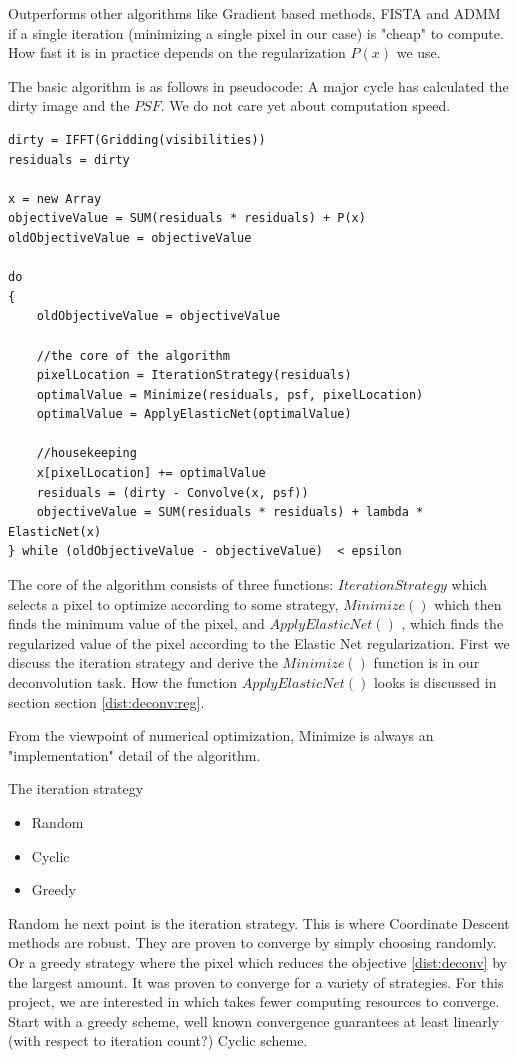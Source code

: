 Outperforms other algorithms like Gradient based methods, FISTA and ADMM if a single iteration (minimizing a single pixel in our case) is "cheap" to compute. 
How fast it is in practice depends on the regularization $P(x)$ we use.

The basic algorithm is as follows in pseudocode: A major cycle has calculated the dirty image and the $PSF$. We do not care yet about computation speed.

\begin{lstlisting}
dirty = IFFT(Gridding(visibilities))
residuals = dirty

x = new Array
objectiveValue = SUM(residuals * residuals) + P(x)
oldObjectiveValue = objectiveValue

do 
{
	oldObjectiveValue = objectiveValue

	//the core of the algorithm
	pixelLocation = IterationStrategy(residuals)
	optimalValue = Minimize(residuals, psf, pixelLocation)
	optimalValue = ApplyElasticNet(optimalValue)
	
	//housekeeping
	x[pixelLocation] += optimalValue
	residuals = (dirty - Convolve(x, psf))
	objectiveValue = SUM(residuals * residuals) + lambda * ElasticNet(x)
} while (oldObjectiveValue - objectiveValue)  < epsilon
\end{lstlisting}

The core of the algorithm consists of three functions: $IterationStrategy$ which selects a pixel to optimize according to some strategy, $Minimize()$ which then finds the minimum value of the pixel, and $ApplyElasticNet()$ , which finds the regularized value of the pixel according to the Elastic Net regularization. First we discuss the iteration strategy and derive the  $Minimize()$ function is in our deconvolution task. How the function $ApplyElasticNet()$ looks is discussed in section section \ref{dist:deconv:reg}.

From the viewpoint of numerical optimization, Minimize is always an "implementation" detail of the algorithm.

The iteration strategy
\begin{itemize}
	\item Random
	\item Cyclic
	\item Greedy
\end{itemize}
Random 
he next point is the iteration strategy. This is where Coordinate Descent methods are robust. They are proven to converge by simply choosing randomly. Or a greedy strategy where the pixel which reduces the objective \eqref{dist:deconv} by the largest amount. It was proven to converge for a variety of strategies. For this project, we are interested in which takes fewer computing resources to converge. 
Start with a greedy scheme, well known convergence guarantees at least linearly (with respect to iteration count?)\cite{luo1992convergence}
Cyclic scheme.

